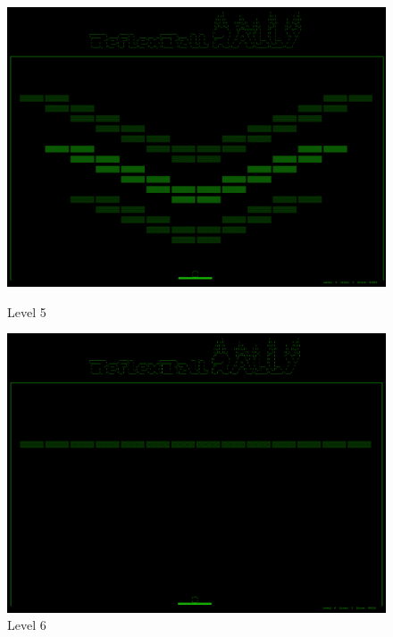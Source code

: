 \begin{figure}[ht]
\begin{minipage}[b]{0.5\linewidth}
\centering
\includegraphics[width=\textwidth]{figs/screenshots/level5.png}
\caption{Level 5}
\label{fig:level5}
\end{minipage}
\hspace{0.5cm}
\begin{minipage}[b]{0.5\linewidth}
\centering
\includegraphics[width=\textwidth]{figs/screenshots/level6.png}
\caption{Level 6}
\label{fig:level6}
\end{minipage}
\end{figure}

\newpage